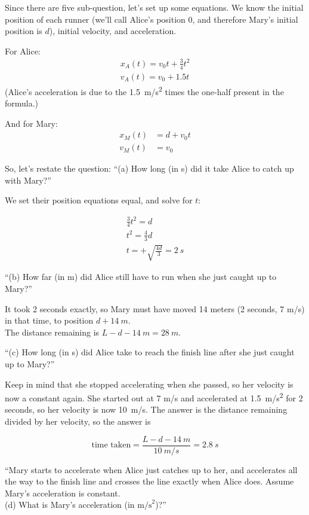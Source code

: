 \documentclass[8.01x]{subfiles}
\begin{document}
Since there are five sub-question, let's set up some equations. We know the initial position of each runner (we'll call Alice's position 0, and therefore Mary's initial position is $d$), initial velocity, and acceleration.

For Alice:
\begin{align}
x_A(t) = v_0 t + \frac{3}{4} t^2\\
v_A(t) = v_0 + 1.5 t
\end{align}
(Alice's acceleration is due to the \SI{1.5}{m/s^2} times the one-half present in the formula.)

And for Mary:
\begin{align}
x_M(t) &= d + v_0 t\\
v_M(t) &= v_0
\end{align}

So, let's restate the question:
``(a) How long (in s) did it take Alice to catch up with Mary?''

We set their position equations equal, and solve for $t$:

\begin{align}
\frac{3}{4} t^2 = d\\
t^2 = \frac{4}{3} d\\
t = +\sqrt{\frac{4d}{3}} = \SI{2}{s}
\end{align}

``(b) How far (in m) did Alice still have to run when she just caught up to Mary?''

It took 2 seconds exactly, so Mary must have moved 14 meters (2 seconds, 7 m/s) in that time, to position $d + \SI{14}{m}$.\\
The distance remaining is $L - d - \SI{14}{m} = \SI{28}{m}$.

``(c) How long (in s) did Alice take to reach the finish line after she just caught up to Mary?''

Keep in mind that she stopped accelerating when she passed, so her velocity is now a constant again. She started out at 7 m/s and accelerated at \SI{1.5}{m/s^2} for 2 seconds, so her velocity is now \SI{10}{m/s}. The answer is the distance remaining divided by her velocity, so the answer is

\begin{equation}
\text{time taken} = \frac{L - d - \SI{14}{m}}{\SI{10}{m/s}} = \SI{2.8}{s}
\end{equation}

``Mary starts to accelerate when Alice just catches up to her, and accelerates all the way to the finish line and crosses the line exactly when Alice does. Assume Mary's acceleration is constant.\\
(d) What is Mary's acceleration (in $\text{m/s}^2$)?''
\end{document}
